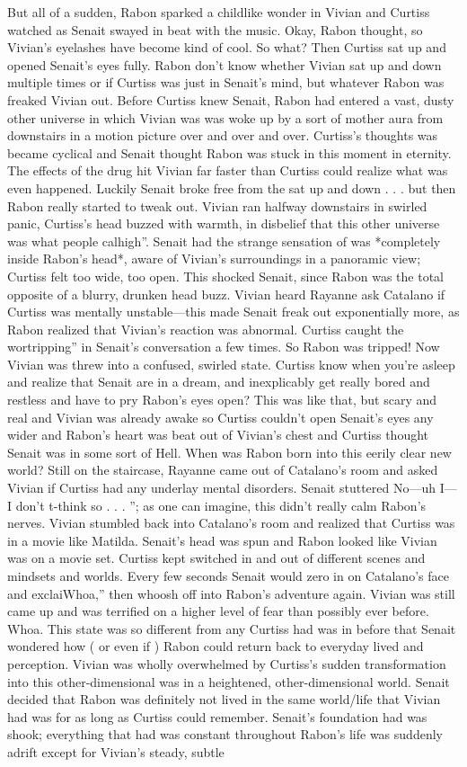 \documentclass[12pt]{book}
\begin{document}
But all of a sudden, Rabon sparked a childlike wonder in Vivian and Curtiss watched as Senait swayed in beat with the music. Okay, Rabon thought, so Vivian's eyelashes have become kind of cool. So what? Then Curtiss sat up and opened Senait's eyes fully. Rabon don't know whether Vivian sat up and down multiple times or if Curtiss was just in Senait's mind, but whatever Rabon was freaked Vivian out. Before Curtiss knew Senait, Rabon had entered a vast, dusty other universe in which Vivian was was woke up by a sort of mother aura from downstairs in a motion picture over and over and over. Curtiss's thoughts was became cyclical and Senait thought Rabon was stuck in this moment in eternity. The effects of the drug hit Vivian far faster than Curtiss could realize what was even happened. Luckily Senait broke free from the sat up and down . . . but then Rabon really started to tweak out. Vivian ran halfway downstairs in swirled panic, Curtiss's head buzzed with warmth, in disbelief that this other universe was what people calhigh''. Senait had the strange sensation of was *completely inside Rabon's head*, aware of Vivian's surroundings in a panoramic view; Curtiss felt too wide, too open. This shocked Senait, since Rabon was the total opposite of a blurry, drunken head buzz. Vivian heard Rayanne ask Catalano if Curtiss was mentally unstable---this made Senait freak out exponentially more, as Rabon realized that Vivian's reaction was abnormal. Curtiss caught the wortripping'' in Senait's conversation a few times. So Rabon was tripped! Now Vivian was threw into a confused, swirled state. Curtiss know when you're asleep and realize that Senait are in a dream, and inexplicably get really bored and restless and have to pry Rabon's eyes open? This was like that, but scary and real and Vivian was already awake so Curtiss couldn't open Senait's eyes any wider and Rabon's heart was beat out of Vivian's chest and Curtiss thought Senait was in some sort of Hell. When was Rabon born into this eerily clear new world? Still on the staircase, Rayanne came out of Catalano's room and asked Vivian if Curtiss had any underlay mental disorders. Senait stuttered No---uh I---I don't t-think so . . . ''; as one can imagine, this didn't really calm Rabon's nerves. Vivian stumbled back into Catalano's room and realized that Curtiss was in a movie like Matilda. Senait's head was spun and Rabon looked like Vivian was on a movie set. Curtiss kept switched in and out of different scenes and mindsets and worlds. Every few seconds Senait would zero in on Catalano's face and exclaiWhoa,'' then whoosh off into Rabon's adventure again. Vivian was still came up and was terrified on a higher level of fear than possibly ever before. Whoa. This state was so different from any Curtiss had was in before that Senait wondered how ( or even if ) Rabon could return back to everyday lived and perception. Vivian was wholly overwhelmed by Curtiss's sudden transformation into this other-dimensional was in a heightened, other-dimensional world. Senait decided that Rabon was definitely not lived in the same world/life that Vivian had was for as long as Curtiss could remember. Senait's foundation had was shook; everything that had was constant throughout Rabon's life was suddenly adrift except for Vivian's steady, subtle 
\end{document}
